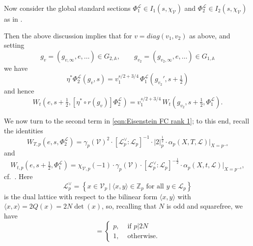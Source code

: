 \documentclass[reqno,oneside]{amsart}
\theoremstyle{plain}
\theoremstyle{remark}
\numberwithin{theorem}{section}
\newcommand{\bbA}{\mathbb A}
\newcommand{\bbZ}{\mathbb Z}
\newcommand{\calL}{\mathcal L}
\newcommand{\calV}{\mathcal V}
\begin{document}
	
	Now consider the global standard sections $\Phi_1^{\calL} \in I_1(s, \chi_{\calV})$ and  $\Phi_2^{\calL} \in I_2(s, \chi_{\calV})$ as in .
	
	
	Then the above discussion implies that for $ v=diag(v_1, v_2)$ as above, and setting
	\begin{equation}
	g_v = (g_{v,\infty}, e,\dots) \in G_{2,\bbA}, \qquad g_{v_2} = (g_{v_2, \infty}, e, \dots)  \in G_{1,\bbA}
	\end{equation}
	we have
	\begin{equation}
	\eta^* \Phi_2^{\calL}(g_v,s) = v_1^{s/2 + 3/4} \, \Phi_1^{\calL}(g_{v_2}', s+\tfrac12)
	\end{equation}
	and hence
	\begin{equation} \label{eqn:whittaker pullback global}
	W_{t}\left( e, s+\tfrac12, \left[ \eta^* \circ r(g_{v}) \right] \Phi_2^{\calL} \right) = v_1^{s/2+3/4} \,   W_t\left( g_{v_2}, s+\tfrac12 , \Phi_1^{\calL} \right).
	\end{equation}
	
	We now turn  to the second term in \eqref{eqn:Eisenstein FC rank 1}; to this end, recall the identities
	\begin{equation}
	W_{T,p}(e, s, \Phi^{\calL}_2) = \gamma_p(\calV)^2 \cdot [\calL_p^{\vee}:\calL_p]^{-1} \cdot |2|_p^{\frac12} \cdot \alpha_p(X,T, \calL)|_{X = p^{-s}}
	\end{equation}
	and
	\begin{equation}	 \label{eqn:whittaker rep dens rank 1}
	W_{t, p}(e, s+ \tfrac12, \Phi^{\calL}_1) = \chi_{\calV,p}(-1)\cdot \gamma_p(\calV) \cdot [\calL_p^{\vee}:\calL_p]^{-\tfrac12} \cdot \alpha_p(X,t, \calL)|_{X = p^{-s}},
	\end{equation}
	cf.\ \cite[Lemma 5.7.1]{KRYbook}. Here
	\begin{equation}
	\calL_p^{\vee} =
	\left\{ x \in \calV_p \ | \ \langle x, y \rangle \in \bbZ_p \text{ for all } y \in \calL_p \right\}
	\end{equation}
	is the dual lattice with respect to the bilinear form $\langle x, y \rangle$ with $\langle x, x \rangle = 2 Q(x) = 2 N \det (x)$, so, recalling that $N$ is odd and squarefree, we have
	\begin{equation}
	[\calL^{\vee}_p: \calL_p] =
	\begin{cases}
	p, & \text{ if } p |2N \\
	1, & \text{ otherwise.}
	\end{cases}
	\end{equation}
	
\end{document}
